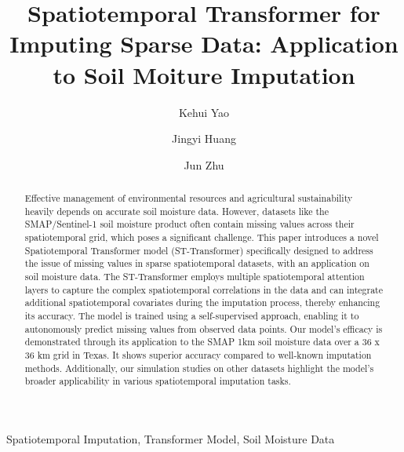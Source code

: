 \documentclass[review]{elsarticle}
\begin{document}
\begin{frontmatter}

\title{Spatiotemporal Transformer for Imputing Sparse Data: Application to Soil Moiture Imputation}




\author[aff1]{Kehui Yao}
\author[aff2]{Jingyi Huang}
\author[aff1]{Jun Zhu}






\begin{abstract}
	Effective management of environmental resources and agricultural sustainability heavily depends on accurate soil moisture data. However, datasets like the SMAP/Sentinel-1 soil moisture product often contain missing values across their spatiotemporal grid, which poses a significant challenge. This paper introduces a novel Spatiotemporal Transformer model (ST-Transformer) specifically designed to address the issue of missing values in sparse spatiotemporal datasets, with an application on soil moisture data. The ST-Transformer employs multiple spatiotemporal attention layers to capture the complex spatiotemporal correlations in the data and can integrate additional spatiotemporal covariates during the imputation process, thereby enhancing its accuracy. The model is trained using a self-supervised approach, enabling it to autonomously predict missing values from observed data points. Our model's efficacy is demonstrated through its application to the SMAP 1km soil moisture data over a 36 x 36 km grid in Texas. It shows superior accuracy compared to well-known imputation methods. Additionally, our simulation studies on other datasets highlight the model's broader applicability in various spatiotemporal imputation tasks.
\end{abstract}

\begin{keyword} 
Spatiotemporal Imputation, 
Transformer Model, Soil Moisture Data
\end{keyword}

\end{frontmatter}
\end{document}
